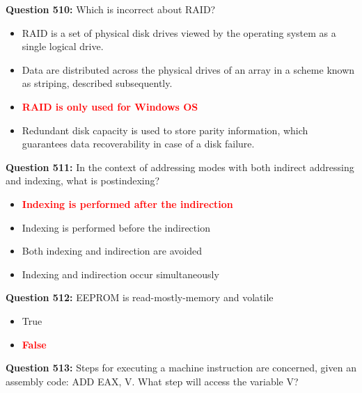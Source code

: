\documentclass[12pt,a4paper]{article}
\begin{document}
\vspace{0.5cm}

\textbf{Question 510:} Which is incorrect about RAID?

\begin{itemize}
    \item[\textbf{A.}] RAID is a set of physical disk drives viewed by the operating system as a single logical drive.
    \item[\textbf{B.}] Data are distributed across the physical drives of an array in a scheme known as striping, described subsequently.
    \item[\textbf{C.}] \textcolor{red}{\textbf{RAID is only used for Windows OS}}
    \item[\textbf{D.}] Redundant disk capacity is used to store parity information, which guarantees data recoverability in case of a disk failure.
\end{itemize}

\vspace{0.5cm}

\textbf{Question 511:} In the context of addressing modes with both indirect addressing and indexing, what is postindexing?

\begin{itemize}
    \item[\textbf{A.}] \textcolor{red}{\textbf{Indexing is performed after the indirection}}
    \item[\textbf{B.}] Indexing is performed before the indirection
    \item[\textbf{C.}] Both indexing and indirection are avoided
    \item[\textbf{D.}] Indexing and indirection occur simultaneously
\end{itemize}

\vspace{0.5cm}

\textbf{Question 512:} EEPROM is read-mostly-memory and volatile

\begin{itemize}
    \item[\textbf{A.}] True
    \item[\textbf{B.}] \textcolor{red}{\textbf{False}}
\end{itemize}

\vspace{0.5cm}

\textbf{Question 513:} Steps for executing a machine instruction are concerned, given an assembly code: ADD EAX, V. What step will access the variable V?
\end{document}
